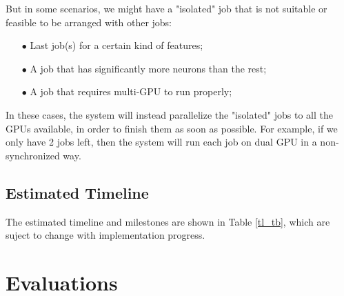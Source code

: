 \documentclass[conference]{IEEEtran}
\begin{document}
But in some scenarios, we might have a "isolated" job that is not suitable or feasible to be arranged with other jobs:
\begin{itemize}
	\item[$\bullet$]  Last job(s) for a certain kind of features;
	\item[$\bullet$]  A job that has significantly more neurons than the rest;
	\item[$\bullet$]  A job that requires multi-GPU to run properly; 
\end{itemize}
In these cases, the system will instead parallelize the "isolated" jobs to all the GPUs available, in order to finish them as soon as possible. 
For example, if we only have 2 jobs left, then the system will run each job on dual GPU in a non-synchronized way. 

\subsection{Estimated Timeline} \label{sebsec_esttl}

The estimated timeline and milestones are shown in Table \ref{tl_tb}, which are suject to change with implementation progress. 

\begin{table}[!htb]
	\centering
	\caption{\small 
		Estimated timeline. }
	\label{tl_tb}
\end{table}

\section{Evaluations} \label{sec_eval}
\end{document}
